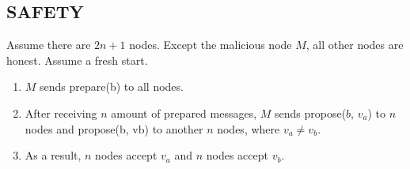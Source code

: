 \documentclass[12pt]{article}
\begin{document}
\subsection{SAFETY}

Assume there are $2n + 1$ nodes. Except the malicious node $M$, all other nodes are honest. Assume a fresh start.

\begin{enumerate}
    \item $M$ sends prepare(b) to all nodes.
    \item After receiving $n$ amount of prepared messages, $M$ sends propose($b$, $v_a$) to $n$ nodes and propose(b, vb) to another $n$ nodes, where $v_a \neq v_b$.
    \item As a result, $n$ nodes accept $v_a$ and $n$ nodes accept $v_b$.
\end{enumerate}
\end{document}
